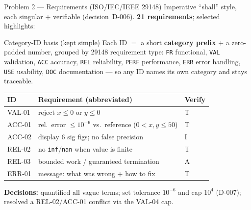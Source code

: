 \documentclass[aspectratio=169]{beamer}
\begin{document}
\begin{frame}{Problem 2 --- Requirements (ISO/IEC/IEEE 29148)}
  Imperative ``shall'' style, each singular + verifiable (decision~D-006).
  \textbf{21 requirements}; selected highlights:
  \begin{block}{Category-ID basis (kept simple)}
    \footnotesize Each ID $=$ a short \textbf{category prefix} $+$ a zero-padded number,
    grouped by 29148 requirement type: \texttt{FR} functional, \texttt{VAL} validation,
    \texttt{ACC} accuracy, \texttt{REL} reliability, \texttt{PERF} performance,
    \texttt{ERR} error handling, \texttt{USE} usability, \texttt{DOC} documentation ---
    so any ID names its own category and stays traceable.
  \end{block}
  \begin{center}\footnotesize
  \begin{tabular}{@{}lll@{}}
    \toprule
    ID & Requirement (abbreviated) & Verify\\
    \midrule
    VAL-01 & reject $x\le0$ or $y\le0$ & T\\
    ACC-01 & rel.\ error $\le 10^{-6}$ vs.\ reference ($0<x,y\le50$) & T\\
    ACC-02 & display 6 sig figs; no false precision & I\\
    REL-02 & no \texttt{inf}/\texttt{nan} when value is finite & T\\
    REL-03 & bounded work / guaranteed termination & A\\
    ERR-01 & message: what was wrong + how to fix & T\\
    \bottomrule
  \end{tabular}
  \end{center}
  \footnotesize\textbf{Decisions:} quantified all vague terms; set tolerance $10^{-6}$ and
  cap $10^4$ (D-007); resolved a REL-02/ACC-01 conflict via the VAL-04 cap.
\end{frame}
\end{document}
